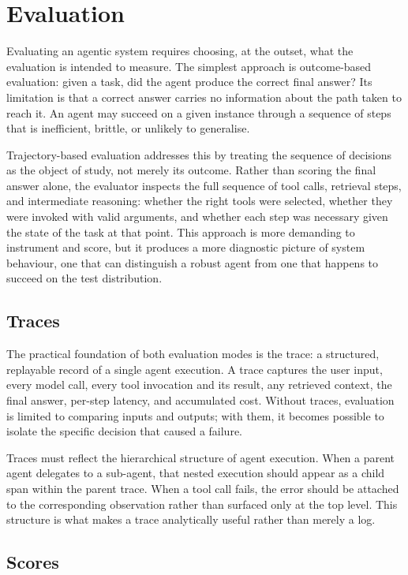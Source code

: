\chapter{Evaluation}

Evaluating an agentic system requires choosing, at the outset, what the evaluation is 
intended to measure. The simplest approach is outcome-based evaluation: given a task, did 
the agent produce the correct final answer? Its limitation is that a correct answer carries 
no information about the path taken to reach it. An agent may succeed on a given instance 
through a sequence of steps that is inefficient, brittle, or unlikely to generalise.

Trajectory-based evaluation addresses this by treating the sequence of decisions as the 
object of study, not merely its outcome. Rather than scoring the final answer alone, the 
evaluator inspects the full sequence of tool calls, retrieval steps, and intermediate 
reasoning: whether the right tools were selected, whether they were invoked with valid 
arguments, and whether each step was necessary given the state of the task at that point. 
This approach is more demanding to instrument and score, but it produces a more diagnostic 
picture of system behaviour, one that can distinguish a robust agent from one that happens 
to succeed on the test distribution.

\section{Traces}

The practical foundation of both evaluation modes is the trace: a structured, replayable 
record of a single agent execution. A trace captures the user input, every model call, every 
tool invocation and its result, any retrieved context, the final answer, per-step latency, 
and accumulated cost. Without traces, evaluation is limited to comparing inputs and outputs; 
with them, it becomes possible to isolate the specific decision that caused a failure.

Traces must reflect the hierarchical structure of agent execution. When a parent agent 
delegates to a sub-agent, that nested execution should appear as a child span within the 
parent trace. When a tool call fails, the error should be attached to the corresponding 
observation rather than surfaced only at the top level. This structure is what makes a trace 
analytically useful rather than merely a log.

\section{Scores}

